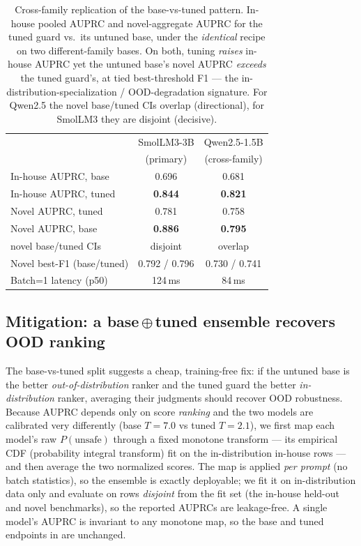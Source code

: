 \documentclass[sigconf,nonacm]{acmart}
\begin{document}
\begin{table}[t]
\small
\centering
\caption{Cross-family replication of the base-vs-tuned pattern. In-house pooled AUPRC and novel-aggregate AUPRC for the tuned guard vs.\ its untuned base, under the \emph{identical} recipe on two different-family bases. On both, tuning \emph{raises} in-house AUPRC yet the untuned base's novel AUPRC \emph{exceeds} the tuned guard's, at tied best-threshold F1 --- the in-distribution-specialization / OOD-degradation signature. For Qwen2.5 the novel base/tuned CIs overlap (directional), for SmolLM3 they are disjoint (decisive).}
\label{tab:cross-family}
\begin{tabular}{lcc}
\toprule
 & SmolLM3-3B & Qwen2.5-1.5B \\
 & (primary) & (cross-family) \\
\midrule
In-house AUPRC, base & 0.696 & 0.681 \\
In-house AUPRC, tuned & \textbf{0.844} & \textbf{0.821} \\
\midrule
Novel AUPRC, tuned & 0.781 & 0.758 \\
Novel AUPRC, base & \textbf{0.886} & \textbf{0.795} \\
\quad novel base/tuned CIs & disjoint & overlap \\
Novel best-F1 (base/tuned) & 0.792 / 0.796 & 0.730 / 0.741 \\
\midrule
Batch=1 latency (p50) & 124\,ms & 84\,ms \\
\bottomrule
\end{tabular}
\end{table}

\subsection{Mitigation: a base\,$\oplus$\,tuned ensemble recovers OOD ranking}
\label{sec:ensemble}

The base-vs-tuned split suggests a cheap, training-free fix: if the untuned base is the better \emph{out-of-distribution} ranker and the tuned guard the better \emph{in-distribution} ranker, averaging their judgments should recover OOD robustness. Because AUPRC depends only on score \emph{ranking} and the two models are calibrated very differently (base $T{=}7.0$ vs tuned $T{=}2.1$), we first map each model's raw $P(\text{unsafe})$ through a fixed monotone transform --- its empirical CDF (probability integral transform) fit on the in-distribution in-house rows --- and then average the two normalized scores. The map is applied \emph{per prompt} (no batch statistics), so the ensemble is exactly deployable; we fit it on in-distribution data only and evaluate on rows \emph{disjoint} from the fit set (the in-house held-out and novel benchmarks), so the reported AUPRCs are leakage-free. A single model's AUPRC is invariant to any monotone map, so the base and tuned endpoints in  are unchanged.
\end{document}
